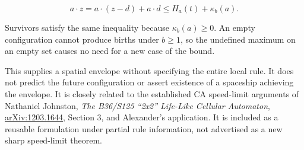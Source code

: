 \documentclass[
  11pt,
]{article}
\begin{document}
\[a\cdot z=a\cdot(z-d)+a\cdot d\le H_a(t)+\kappa_b(a).\]

Survivors satisfy the same inequality because \(\kappa_b(a)\ge0\). An
empty configuration cannot produce births under \(b\ge1\), so the
undefined maximum on an empty set causes no need for a new case of the
bound.

This supplies a spatial envelope without specifying the entire local
rule. It does not predict the future configuration or assert existence
of a spaceship achieving the envelope. It is closely related to the
established CA speed-limit arguments of Nathaniel Johnston, \emph{The
B36/S125 ``2x2'' Life-Like Cellular Automaton},
\href{https://arxiv.org/abs/1203.1644}{arXiv:1203.1644}, Section 3, and
Alexander's application. It is included as a reusable formulation under
partial rule information, not advertised as a new sharp speed-limit
theorem.
\end{document}
